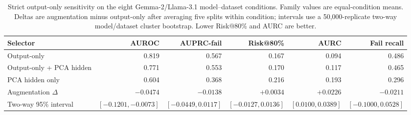 \begin{table}[t]
\centering
\small
\caption{Strict output-only sensitivity on the eight Gemma-2/Llama-3.1 model--dataset conditions. Family values are equal-condition means. Deltas are augmentation minus output-only after averaging five splits within condition; intervals use a 50,000-replicate two-way model/dataset cluster bootstrap. Lower Risk@80\% and AURC are better.}
\label{tab:strict-output-subset}
\begin{adjustbox}{width=\textwidth}
\begin{tabular}{lrrrrr}
\toprule
Selector & AUROC & AUPRC-fail & Risk@80\% & AURC & Fail recall \\
\midrule
Output-only & 0.819 & 0.567 & 0.167 & 0.094 & 0.486 \\
Output-only + PCA hidden & 0.771 & 0.553 & 0.170 & 0.117 & 0.465 \\
PCA hidden only & 0.604 & 0.368 & 0.216 & 0.193 & 0.296 \\
\midrule
Augmentation $\Delta$ & $-0.0474$ & $-0.0138$ & $+0.0034$ & $+0.0226$ & $-0.0211$ \\
Two-way 95\% interval & $[-0.1201,-0.0073]$ & $[-0.0449,0.0117]$ & $[-0.0127,0.0136]$ & $[0.0100,0.0389]$ & $[-0.1000,0.0528]$ \\
\bottomrule
\end{tabular}
\end{adjustbox}
\end{table}
